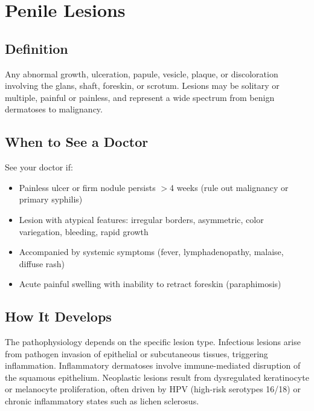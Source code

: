 \chapter{Penile Lesions}

\section*{Definition}
Any abnormal growth, ulceration, papule, vesicle, plaque, or discoloration involving the glans, shaft, foreskin, or scrotum. Lesions may be solitary or multiple, painful or painless, and represent a wide spectrum from benign dermatoses to malignancy.

\section*{When to See a Doctor}
See your doctor if:
\begin{itemize}
  \item Painless ulcer or firm nodule persists $>$4 weeks (rule out malignancy or primary syphilis)
  \item Lesion with atypical features: irregular borders, asymmetric, color variegation, bleeding, rapid growth
  \item Accompanied by systemic symptoms (fever, lymphadenopathy, malaise, diffuse rash)
  \item Acute painful swelling with inability to retract foreskin (paraphimosis)
\end{itemize}

\section*{How It Develops}
The pathophysiology depends on the specific lesion type. Infectious lesions arise from pathogen invasion of epithelial or subcutaneous tissues, triggering inflammation. Inflammatory dermatoses involve immune-mediated disruption of the squamous epithelium. Neoplastic lesions result from dysregulated keratinocyte or melanocyte proliferation, often driven by HPV (high-risk serotypes 16/18) or chronic inflammatory states such as lichen sclerosus.

